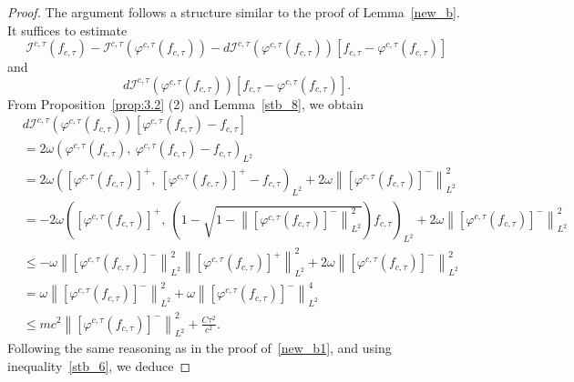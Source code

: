 \documentclass{amsart}
\theoremstyle{plain}
\theoremstyle{definition}
\theoremstyle{remark}
\numberwithin{equation}{section} \numberwithin{figure}{section}
\begin{document}
            \begin{proof}
            The argument follows a structure similar to the proof of Lemma~\ref{new_b}. 
            It suffices to estimate
            \[
            \mathcal{I}^{c,\tau}(f_{c,\tau}) - \mathcal{I}^{c,\tau}(\varphi^{c,\tau}(f_{c, \tau})) - d\mathcal{I}^{c,\tau}(\varphi^{c,\tau}(f_{c, \tau}))[f_{c,\tau} - \varphi^{c,\tau}(f_{c, \tau})]
            \]
            and
            \[
            d\mathcal{I}^{c,\tau}(\varphi^{c,\tau}(f_{c, \tau}))[f_{c,\tau} - \varphi^{c,\tau}(f_{c, \tau})].
            \]            
            From Proposition~\ref{prop:3.2} (2) and Lemma~\ref{stb_8}, we obtain
            \begin{equation}\label{stb_11}
            \begin{aligned}
            &d\mathcal{I}^{c,\tau}(\varphi^{c,\tau}(f_{c, \tau}))[\varphi^{c,\tau}(f_{c, \tau}) - f_{c,\tau}] \\
            &= 2\omega \left( \varphi^{c,\tau}(f_{c, \tau}),\ \varphi^{c,\tau}(f_{c, \tau}) - f_{c,\tau} \right)_{L^2} \\
            &= 2\omega \left( \left[\varphi^{c,\tau}(f_{c, \tau})\right]^+,\ \left[\varphi^{c,\tau}(f_{c, \tau})\right]^+ - f_{c,\tau} \right)_{L^2} + 2\omega \left\| \left[\varphi^{c,\tau}(f_{c, \tau})\right]^- \right\|_{L^2}^2 \\
            &= -2\omega \left( \left[\varphi^{c,\tau}(f_{c, \tau})\right]^+,\ \left(1 - \sqrt{1 - \left\| \left[\varphi^{c,\tau}(f_{c, \tau})\right]^- \right\|_{L^2}^2} \right) f_{c,\tau} \right)_{L^2} + 2\omega \left\| \left[\varphi^{c,\tau}(f_{c, \tau})\right]^- \right\|_{L^2}^2 \\
            &\leq -{\omega \left\| \left[\varphi^{c,\tau}(f_{c, \tau})\right]^- \right\|_{L^2}^2 \left\| \left[\varphi^{c,\tau}(f_{c, \tau})\right]^+ \right\|_{L^2}^2} + 2\omega \left\| \left[\varphi^{c,\tau}(f_{c, \tau})\right]^- \right\|_{L^2}^2 
            \\
            &=\omega\left\| \left[\varphi^{c,\tau}(f_{c, \tau})\right]^- \right\|_{L^2}^2+
            \omega\left\| \left[\varphi^{c,\tau}(f_{c, \tau})\right]^- \right\|_{L^2}^4
            \\
            &\leq m c^2 \left\| \left[\varphi^{c,\tau}(f_{c, \tau})\right]^- \right\|_{L^2}^2 + \frac{C\tau^2}{c^2}.
            \end{aligned}
            \end{equation}            
            Following the same reasoning as in the proof of~\eqref{new_b1}, and using inequality~\eqref{stb_6}, we deduce

\end{proof}
\end{document}
